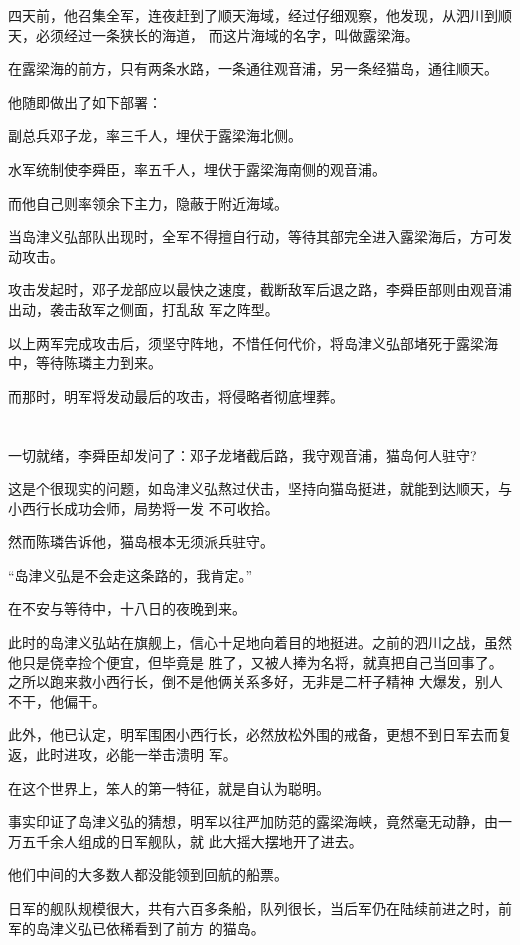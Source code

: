 \documentclass[11pt,a4paper,onecolumn]{article}
\begin{document}
四天前，他召集全军，连夜赶到了顺天海域，经过仔细观察，他发现，从泗川到顺天，必须经过一条狭长的海道，
而这片海域的名字，叫做露梁海。

在露梁海的前方，只有两条水路，一条通往观音浦，另一条经猫岛，通往顺天。

他随即做出了如下部署：

副总兵邓子龙，率三千人，埋伏于露梁海北侧。

水军统制使李舜臣，率五千人，埋伏于露梁海南侧的观音浦。

而他自己则率领余下主力，隐蔽于附近海域。

当岛津义弘部队出现时，全军不得擅自行动，等待其部完全进入露梁海后，方可发动攻击。

攻击发起时，邓子龙部应以最快之速度，截断敌军后退之路，李舜臣部则由观音浦出动，袭击敌军之侧面，打乱敌
军之阵型。

以上两军完成攻击后，须坚守阵地，不惜任何代价，将岛津义弘部堵死于露梁海中，等待陈璘主力到来。

而那时，明军将发动最后的攻击，将侵略者彻底埋葬。

\section[\thesection]{}

一切就绪，李舜臣却发问了：邓子龙堵截后路，我守观音浦，猫岛何人驻守?

这是个很现实的问题，如岛津义弘熬过伏击，坚持向猫岛挺进，就能到达顺天，与小西行长成功会师，局势将一发
不可收拾。

然而陈璘告诉他，猫岛根本无须派兵驻守。

``岛津义弘是不会走这条路的，我肯定。''

在不安与等待中，十八日的夜晚到来。

此时的岛津义弘站在旗舰上，信心十足地向着目的地挺进。之前的泗川之战，虽然他只是侥幸捡个便宜，但毕竟是
胜了，又被人捧为名将，就真把自己当回事了。之所以跑来救小西行长，倒不是他俩关系多好，无非是二杆子精神
大爆发，别人不干，他偏干。

此外，他已认定，明军围困小西行长，必然放松外围的戒备，更想不到日军去而复返，此时进攻，必能一举击溃明
军。

在这个世界上，笨人的第一特征，就是自认为聪明。

事实印证了岛津义弘的猜想，明军以往严加防范的露梁海峡，竟然毫无动静，由一万五千余人组成的日军舰队，就
此大摇大摆地开了进去。

他们中间的大多数人都没能领到回航的船票。

日军的舰队规模很大，共有六百多条船，队列很长，当后军仍在陆续前进之时，前军的岛津义弘已依稀看到了前方
的猫岛。
\end{document}
